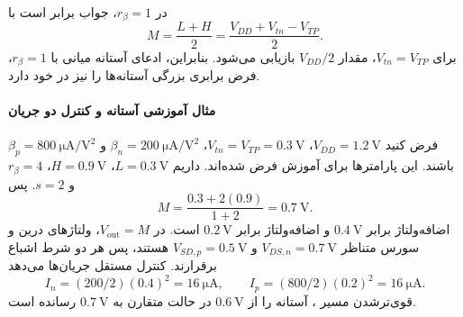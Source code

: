 در \(r_\beta=1\)، جواب برابر است با
\begin{equation}
 M=\frac{L+H}{2}
   =\frac{V_{DD}+V_{tn}-V_{TP}}{2}.
 \label{eq:beta-equal-strength}
\end{equation}
برای \(V_{tn}=V_{TP}\)، مقدار \(V_{DD}/2\) بازیابی می‌شود.
بنابراین، ادعای آستانه میانی با \(r_\beta=1\)، فرض برابری
بزرگی آستانه‌ها را نیز در خود دارد.

\paragraph*{مثال آموزشی آستانه و کنترل دو جریان}
فرض کنید \(V_{DD}=\qty{1.2}{\volt}\)،
\(V_{tn}=V_{TP}=\qty{0.3}{\volt}\)،
\(\beta_n=\qty{200}{\micro\ampere\per\volt\squared}\) و
\(\beta_p=\qty{800}{\micro\ampere\per\volt\squared}\) باشند.
این پارامترها برای آموزش فرض شده‌اند. داریم
\(L=\qty{0.3}{\volt}\)، \(H=\qty{0.9}{\volt}\)،
\(r_\beta=4\) و \(s=2\). پس
\begin{equation*}
 M=\frac{0.3+2(0.9)}{1+2}=\qty{0.7}{\volt}.
\end{equation*}
اضافه‌ولتاژ  برابر \(\qty{0.4}{\volt}\) و
اضافه‌ولتاژ  برابر \(\qty{0.2}{\volt}\) است.
در \(V_{\mathrm{out}}=M\)، ولتاژهای درین و سورس متناظر
\(V_{DS,n}=\qty{0.7}{\volt}\) و
\(V_{SD,p}=\qty{0.5}{\volt}\) هستند، پس هر دو شرط اشباع برقرارند.
کنترل مستقل جریان‌ها می‌دهد
\begin{equation*}
 I_n=(200/2)(0.4)^2=\qty{16}{\micro\ampere},\qquad
 I_p=(800/2)(0.2)^2=\qty{16}{\micro\ampere}.
\end{equation*}
قوی‌ترشدن مسیر ، آستانه را از
\(\qty{0.6}{\volt}\) در حالت متقارن به
\(\qty{0.7}{\volt}\) رسانده است.

